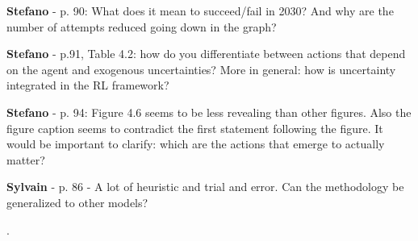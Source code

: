 \documentclass[12pt,a4paper]{article}
\begin{document}
\begin{mdframed}[style=comment] %
{\color{orange} \textbf{Stefano}} - p. 90: What does it mean to succeed/fail in 2030? And why are the number of attempts reduced going down in the graph?
\end{mdframed}

\noindent 

\begin{mdframed}[style=manuscript] %

\end{mdframed}

\begin{mdframed}[style=comment] %
{\color{orange} \textbf{Stefano}} - p.91, Table 4.2: how do you differentiate between actions that depend on the agent and exogenous uncertainties? More in general: how is uncertainty integrated in the RL framework?
\end{mdframed}

\noindent 

\begin{mdframed}[style=manuscript] %

\end{mdframed}

\begin{mdframed}[style=comment] %
{\color{orange} \textbf{Stefano}} - p. 94: Figure 4.6 seems to be less revealing than other figures. Also the figure caption seems to contradict the first statement following the figure. It would be important to clarify: which are the actions that emerge to actually matter?
\end{mdframed}

\noindent 

\begin{mdframed}[style=manuscript] %

\end{mdframed}

\begin{mdframed}[style=comment] %
{\color{purple} \textbf{Sylvain}} - p. 86 - A lot of heuristic and trial and error. Can the methodology be generalized to other models?
\end{mdframed}

\noindent {\color{blue} }. 

\begin{mdframed}[style=manuscript] %

\end{mdframed}
\end{document}

